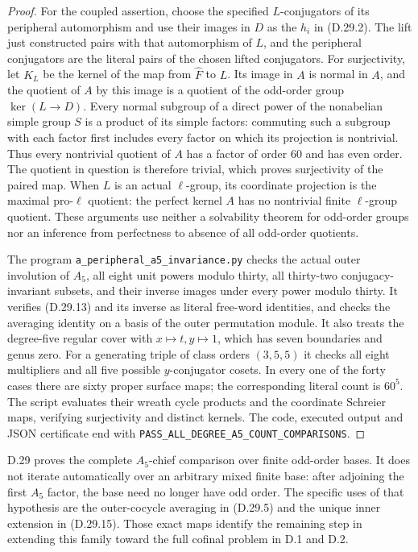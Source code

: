 \begin{proof}
For the coupled assertion, choose the specified
$L$-conjugators of its peripheral automorphism
and use their images in $D$ as the $h_i$ in
\textup{(D.29.2)}.  The lift just constructed
pairs with that automorphism of $L$, and
the peripheral conjugators are the literal
pairs of the chosen lifted conjugators.
For surjectivity, let $K_L$ be the kernel of the
map from $\widehat F$ to $L$.  Its image in $A$
is normal in $A$, and the quotient of $A$ by this
image is a quotient of the odd-order group
$\ker(L\to D)$.  Every normal subgroup of a direct
power of the nonabelian simple group $S$ is a
product of its simple factors: commuting such a
subgroup with each factor first includes every
factor on which its projection is nontrivial.
Thus every nontrivial quotient of $A$ has a
factor of order $60$ and has even order.
The quotient in question is therefore trivial,
which proves surjectivity of the paired map.
When $L$ is an actual $\ell$-group, its coordinate
projection is the maximal pro-$\ell$ quotient:
the perfect kernel $A$ has no nontrivial finite
$\ell$-group quotient.  These arguments use
neither a solvability theorem for odd-order
groups nor an inference from perfectness to
absence of all odd-order quotients.

The program \texttt{a\_peripheral\_a5\_invariance.py}
checks the actual outer involution of $A_5$,
all eight unit powers modulo thirty, all
thirty-two conjugacy-invariant subsets, and
their inverse images under every power modulo thirty.
It verifies \textup{(D.29.13)} and its inverse
as literal free-word identities, and checks
the averaging identity on a basis of the
outer permutation module.
It also treats the degree-five regular cover
with $x\mapsto t,y\mapsto1$, which has seven
boundaries and genus zero.  For a generating
triple of class orders $(3,5,5)$ it checks
all eight multipliers and all five possible
$y$-conjugator cosets.  In every one of the
forty cases there are sixty proper surface
maps; the corresponding literal count is
$60^5$.  The script evaluates their wreath
cycle products and the coordinate Schreier
maps, verifying surjectivity and distinct
kernels.  The code, executed output and
JSON certificate end with
\texttt{PASS\_ALL\_DEGREE\_A5\_COUNT\_COMPARISONS}.
\end{proof}

D.29 proves the complete $A_5$-chief comparison
over finite odd-order bases.  It does not
iterate automatically over an arbitrary
mixed finite base: after adjoining the
first $A_5$ factor, the base need no longer
have odd order.  The specific uses of
that hypothesis are the outer-cocycle
averaging in \textup{(D.29.5)} and the
unique inner extension in
\textup{(D.29.15)}.  Those exact maps
identify the remaining step in extending
this family toward the full cofinal
problem in D.1 and D.2.
